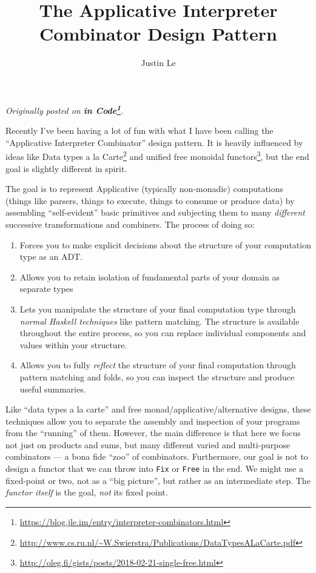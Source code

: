 \documentclass[]{article}
\title{The Applicative Interpreter Combinator Design Pattern}
\author{Justin Le}
\renewcommand{\href}[2]{#2\footnote{\url{#1}}}
\begin{document}
\maketitle

\emph{Originally posted on
\textbf{\href{https://blog.jle.im/entry/interpreter-combinators.html}{in
Code}}.}

Recently I've been having a lot of fun with what I have been calling the
``Applicative Interpreter Combinator'' design pattern. It is heavily influenced
by ideas like
\href{http://www.cs.ru.nl/~W.Swierstra/Publications/DataTypesALaCarte.pdf}{Data
types a la Carte} and
\href{http://oleg.fi/gists/posts/2018-02-21-single-free.html}{unified free
monoidal functors}, but the end goal is slightly different in spirit.

The goal is to represent Applicative (typically non-monadic) computations
(things like parsers, things to execute, things to consume or produce data) by
assembling ``self-evident'' basic primitives and subjecting them to many
\emph{different} successive transformations and combiners. The process of doing
so:

\begin{enumerate}
\def\labelenumi{\arabic{enumi}.}
\tightlist
\item
  Forces you to make explicit decisions about the structure of your computation
  type as an ADT.
\item
  Allows you to retain isolation of fundamental parts of your domain as separate
  types
\item
  Lets you manipulate the structure of your final computation type through
  \emph{normal Haskell techniques} like pattern matching. The structure is
  available throughout the entire process, so you can replace individual
  components and values within your structure.
\item
  Allows you to fully \emph{reflect} the structure of your final computation
  through pattern matching and folds, so you can inspect the structure and
  produce useful summaries.
\end{enumerate}

Like ``data types a la carte'' and free monad/applicative/alternative designs,
these techniques allow you to separate the assembly and inspection of your
programs from the ``running'' of them. However, the main difference is that here
we focus not just on products and sums, but many different varied and
multi-purpose combinators --- a bona fide ``zoo'' of combinators. Furthermore,
our goal is not to design a functor that we can throw into \texttt{Fix} or
\texttt{Free} in the end. We might use a fixed-point or two, not as a ``big
picture'', but rather as an intermediate step. The \emph{functor itself} is the
goal, \emph{not} its fixed point.
\end{document}
